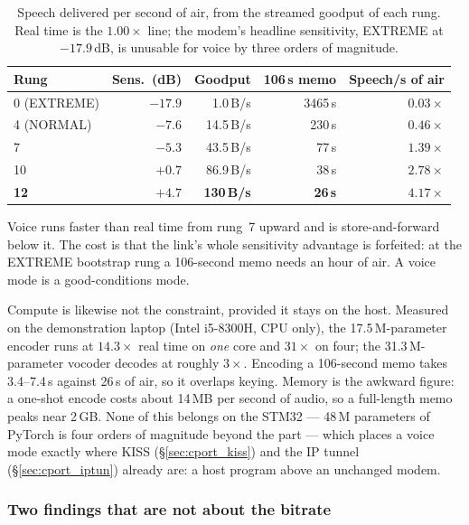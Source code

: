 \begin{table}[H]
    \centering
    \caption{Speech delivered per second of air, from the streamed
             goodput of each rung.  Real time is the $1.00\times$ line;
             the modem's headline sensitivity, EXTREME at
             $-17.9$\,dB, is unusable for voice by three orders of
             magnitude.}
    \label{tab:voice_rate}
    \small
    \begin{tabular}{@{}lrrrr@{}}
    \toprule
    \textbf{Rung} & \textbf{Sens.\ (dB)} & \textbf{Goodput} &
    \textbf{106\,s memo} & \textbf{Speech/s of air} \\
    \midrule
    0 (EXTREME)  & $-17.9$ &   1.0\,B/s & 3465\,s & $0.03\times$ \\
    4 (NORMAL)   & $-7.6$  &  14.5\,B/s &  230\,s & $0.46\times$ \\
    7            & $-5.3$  &  43.5\,B/s &   77\,s & $1.39\times$ \\
    10           & $+0.7$  &  86.9\,B/s &   38\,s & $2.78\times$ \\
    \textbf{12}  & $+4.7$  & \textbf{130\,B/s} & \textbf{26\,s} &
    $\mathbf{4.17\times}$ \\
    \bottomrule
    \end{tabular}
\end{table}

Voice runs faster than real time from rung~7 upward and is
store-and-forward below it.  The cost is that the link's whole
sensitivity advantage is forfeited: at the EXTREME bootstrap rung a
106-second memo needs an hour of air.  A voice mode is a
good-conditions mode.

Compute is likewise not the constraint, provided it stays on the host.
Measured on the demonstration laptop (Intel i5-8300H, CPU only), the
17.5\,M-parameter encoder runs at $14.3\times$ real time on
\emph{one} core and $31\times$ on four; the 31.3\,M-parameter vocoder
decodes at roughly $3\times$.  Encoding a 106-second memo takes
3.4--7.4\,s against 26\,s of air, so it overlaps keying.  Memory is the
awkward figure: a one-shot encode costs about 14\,MB per second of
audio, so a full-length memo peaks near 2\,GB.  None of this belongs on
the STM32 --- 48\,M parameters of PyTorch is four orders of magnitude
beyond the part --- which places a voice mode exactly where KISS
(\S\ref{sec:cport_kiss}) and the IP tunnel (\S\ref{sec:cport_iptun})
already are: a host program above an unchanged modem.

\subsubsection{Two findings that are not about the bitrate}

